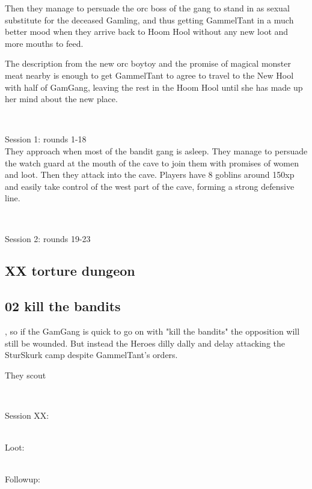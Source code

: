 Then they manage to persuade the orc boss of the gang to stand in as sexual substitute for the deceased Gamling, and thus getting GammelTant in a much better mood when they arrive back to Hoom Hool without any new loot and more mouths to feed.

The description from the new orc boytoy and the promise of magical monster meat nearby is enough to get GammelTant to agree to travel to the New Hool with half of GamGang, leaving the rest in the Hoom Hool until she has made up her mind about the new place.

\

Session 1: rounds 1-18 \\
They approach when most of the bandit gang is asleep. They manage to persuade the watch guard at the mouth of the cave to join them with promises of women and loot. Then they attack into the cave. Players have 8 goblins around 150xp and easily take control of the west part of the cave, forming a strong defensive line.

\

Session 2: rounds 19-23 \\






\subsection*{XX torture dungeon}







\subsection*{02 kill the bandits}

, so if the GamGang is quick to go on with "kill the bandits" the opposition will still be wounded. But instead the Heroes dilly dally and delay attacking the SturSkurk camp despite GammelTant's orders.


They scout 

\

Session XX:\\

\

Loot:\\

\

Followup:\\







